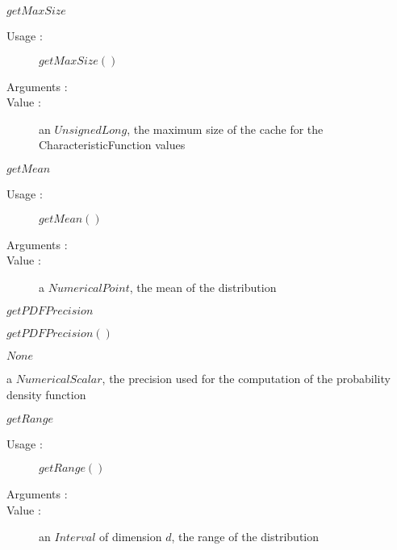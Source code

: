 \begin{description}
\begin{description}
  \item $getMaxSize$
    \begin{description}
    \item[Usage :]  $getMaxSize()$
    \item[Arguments :]  \strut
    \item[Value :] an $UnsignedLong$, the maximum size of the cache for the CharacteristicFunction values
    \end{description}

  \item $getMean$
    \begin{description}
    \item[Usage :]  $getMean()$
    \item[Arguments :]  \strut
    \item[Value :] a $NumericalPoint$, the mean of the distribution
    \end{description}

  \item $getPDFPrecision$
    \begin{description}
    \item[Usage :]  $getPDFPrecision()$
    \item[Arguments :]  \strut
    \begin{description}
      \item $None$
    \end{description}
    \item[Value :] a $NumericalScalar$, the precision used for the computation of the probability density function

  \item $getRange$
    \begin{description}
    \item[Usage :]  $getRange()$
    \item[Arguments :]  \strut
    \item[Value :] an $Interval$ of dimension $d$, the range of the distribution
    \end{description}


\end{description}
\end{description}
\end{description}
